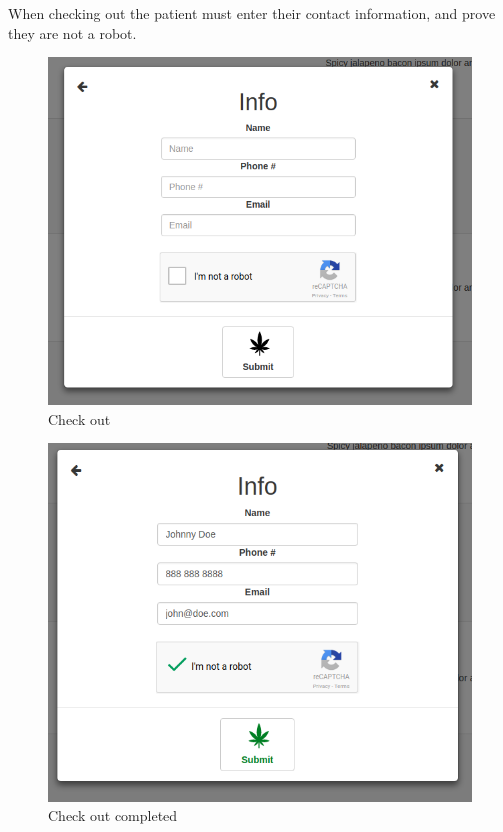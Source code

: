 \documentclass[]{book}
\theoremstyle{definition}
\theoremstyle{definition}
\theoremstyle{definition}
\theoremstyle{remark}
\begin{document}
When checking out the patient must enter their contact information, and
prove they are not a robot.

\begin{figure}
\centering
\includegraphics{images/M8.png}
\caption{Check out}
\end{figure}

\begin{figure}
\centering
\includegraphics{images/M9.png}
\caption{Check out completed}
\end{figure}
\end{document}
